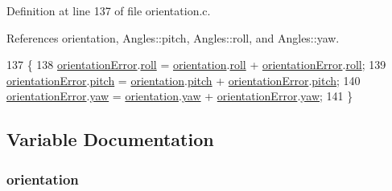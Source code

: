 Definition at line 137 of file orientation.\-c.



References orientation, Angles\-::pitch, Angles\-::roll, and Angles\-::yaw.


\begin{DoxyCode}
137                            \{
138     \hyperlink{group__orientation_gab42c272957b0a5cdc11845ade183c2f9}{orientationError}.\hyperlink{struct_angles_a1d3228afa3a1d6773954f40c1e519eb9}{roll} = \hyperlink{group__orientation_gacd4a2942520b68691db5aebde4e537a4}{orientation}.\hyperlink{struct_angles_a1d3228afa3a1d6773954f40c1e519eb9}{roll} + 
      \hyperlink{group__orientation_gab42c272957b0a5cdc11845ade183c2f9}{orientationError}.\hyperlink{struct_angles_a1d3228afa3a1d6773954f40c1e519eb9}{roll};
139     \hyperlink{group__orientation_gab42c272957b0a5cdc11845ade183c2f9}{orientationError}.\hyperlink{struct_angles_a34c057a0378030db67bd6a129f37d938}{pitch} = \hyperlink{group__orientation_gacd4a2942520b68691db5aebde4e537a4}{orientation}.\hyperlink{struct_angles_a34c057a0378030db67bd6a129f37d938}{pitch} + 
      \hyperlink{group__orientation_gab42c272957b0a5cdc11845ade183c2f9}{orientationError}.\hyperlink{struct_angles_a34c057a0378030db67bd6a129f37d938}{pitch};
140     \hyperlink{group__orientation_gab42c272957b0a5cdc11845ade183c2f9}{orientationError}.\hyperlink{struct_angles_a21cd490f6191f66678f55b4c242a10cf}{yaw} = \hyperlink{group__orientation_gacd4a2942520b68691db5aebde4e537a4}{orientation}.\hyperlink{struct_angles_a21cd490f6191f66678f55b4c242a10cf}{yaw} + 
      \hyperlink{group__orientation_gab42c272957b0a5cdc11845ade183c2f9}{orientationError}.\hyperlink{struct_angles_a21cd490f6191f66678f55b4c242a10cf}{yaw};
141 \}
\end{DoxyCode}


\subsection{Variable Documentation}
\hypertarget{group__orientation_gacd4a2942520b68691db5aebde4e537a4}{
\subsubsection[{orientation}]{ orientation}}\label{group__orientation_gacd4a2942520b68691db5aebde4e537a4}


